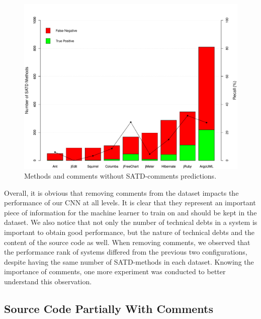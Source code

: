 \begin{figure}[t]
	\centering
	\includegraphics[scale=0.5]{figs/no-satd-pred.pdf}
	\caption{Methods and comments without SATD-comments predictions.}
	\label{fig:no-satd-pred}
	\vspace{-4mm}
\end{figure}

Overall, it is obvious that removing comments from the dataset impacts the performance of our CNN at all levels. It is clear that they represent an important piece of information for the machine learner to train on and should be kept in the dataset. We also notice that not only the number of technical debts in a system is important to obtain good performance, but the nature of technical debts and the content of the source code as well. When removing comments, we observed that the performance rank of systems differed from the previous two configurations, despite having the same number of SATD-methods in each dataset. Knowing the importance of comments, one more experiment was conducted to better understand this observation.


\subsection{Source Code Partially With Comments}


